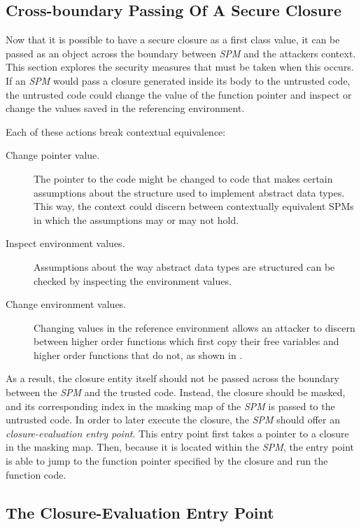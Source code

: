 \documentclass[10pt,a4paper,master=cws, masteroption=ai,english,inputenc=utf8]{kulemt}
\begin{document}
\subsection{Cross-boundary Passing Of A Secure Closure }
Now that it is possible to have a secure closure as a first class value, it can be passed as an object across the boundary between \emph{SPM} and the attackers context.
This section explores the security measures that must be taken when this occurs.
If an \emph{SPM} would pass a closure generated inside its body to the untrusted code, the untrusted code could change the value of the function pointer and inspect or change the values saved in the referencing environment.

Each of these actions break contextual equivalence:
\begin{description}
\item[Change pointer value.] The pointer to the code might be changed to code that makes certain assumptions about the structure used to implement abstract data types.
This way, the context could discern between contextually equivalent SPMs in which the assumptions may or may not hold. 
\item[Inspect environment values.]
Assumptions about the way abstract data types are structured can be checked by inspecting the environment values. 
\item[Change environment values.] Changing values in the reference environment allows an attacker to discern between higher order functions which first copy their free variables and higher order functions that do not, as shown in .
\end{description}

As a result, the closure entity itself should not be passed across the boundary between the \emph{SPM} and the trusted code.
Instead, the closure should be masked, and its corresponding index in the masking map of the \emph{SPM} is passed to the untrusted code.
In order to later execute the closure, the \emph{SPM} should offer an \emph{closure-evaluation entry point}.
This entry point first takes a pointer to a closure in the masking map.
Then, because it is located within the \emph{SPM}, the entry point is able to jump to the function pointer specified by the closure and run the function code.

\subsection{The Closure-Evaluation Entry Point}
\end{document}
